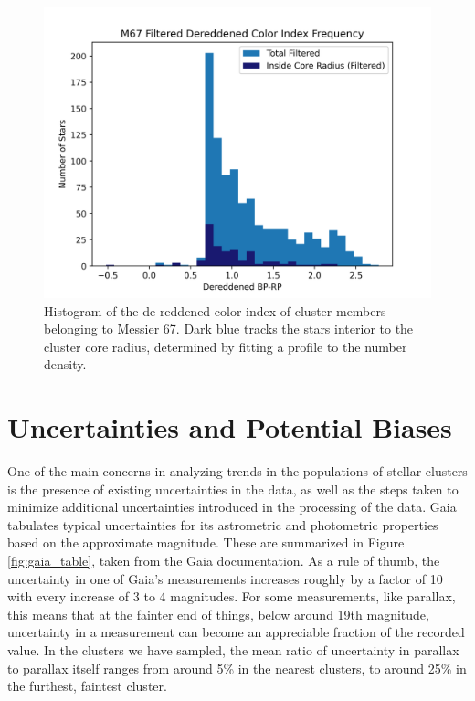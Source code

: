 \documentclass[onecolumn,table,xcdraw,super]{aastex631}
\begin{document}
\begin{figure}[]
    \centering
      \includegraphics[width=4.75in]{figures/M67_colorFrequency_filtered.png}
    \caption{Histogram of the de-reddened color index of cluster members belonging to Messier 67. Dark blue tracks the stars interior to the cluster core radius, determined by fitting a profile to the number density.}
    \label{fig:M67_color_hist}
\end{figure}

\section{Uncertainties and Potential Biases} \label{sec:error}

One of the main concerns in analyzing trends in the populations of stellar clusters is the presence of existing uncertainties in the data, as well as the steps taken to minimize additional uncertainties introduced in the processing of the data. Gaia tabulates typical uncertainties for its astrometric and photometric properties based on the approximate magnitude. These are summarized in Figure \ref{fig:gaia_table}, taken from the Gaia documentation. As a rule of thumb, the uncertainty in one of Gaia's measurements increases roughly by a factor of 10 with every increase of 3 to 4 magnitudes. For some measurements, like parallax, this means that at the fainter end of things, below around 19th magnitude, uncertainty in a measurement can become an appreciable fraction of the recorded value. In the clusters we have sampled, the mean ratio of uncertainty in parallax to parallax itself ranges from around 5\% in the nearest clusters, to around 25\% in the furthest, faintest cluster.
\end{document}
